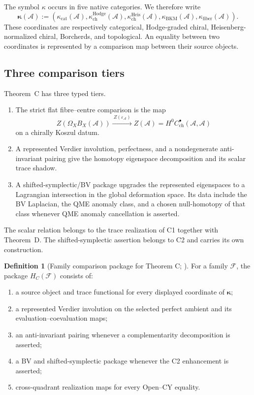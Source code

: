 \documentclass[11pt]{article}
\theoremstyle{plain}
\theoremstyle{definition}
\newtheorem{definition}[theorem]{Definition}
\theoremstyle{remark}
\newcommand{\cA}{\mathcal{A}}
\begin{document}
The symbol \(\kappa\) occurs in five native categories.  We therefore
write
\[
 \boldsymbol\kappa(\cA)
 :=
 \left(
 \kappa_{\mathrm{cat}}(\cA),
 \kappa_{\mathrm{ch}}^{\mathrm{Hodge}}(\cA),
 \kappa_{\mathrm{ch}}^{\mathrm{Heis}}(\cA),
 \kappa_{\mathrm{BKM}}(\cA),
 \kappa_{\mathrm{fiber}}(\cA)
 \right).
\]
These coordinates are respectively categorical, Hodge-graded
chiral, Heisenberg-normalized chiral, Borcherds, and topological.
An equality between two coordinates is represented by a comparison
map between their source objects.

\subsection{Three comparison tiers}

Theorem~C has three typed tiers.

\begin{enumerate}[label=\textsc{C\arabic*.}]
\item The strict flat fibre--centre comparison is the map
\[
 Z\!\left(\Omega_XB_X(\cA)\right)
 \xrightarrow{\ Z(\varepsilon_\cA)\ }
 Z(\cA)=H^0C^\bullet_{\mathrm{ch}}(\cA,\cA)
\]
on a chirally Koszul datum.

\item A represented Verdier involution, perfectness, and a
nondegenerate anti-invariant pairing give the homotopy eigenspace
decomposition and its scalar trace shadow.

\item A shifted-symplectic/BV package upgrades the represented
eigenspaces to a Lagrangian intersection in the global deformation
space.  Its data include the BV Laplacian, the QME anomaly class, and
a chosen null-homotopy of that class whenever QME anomaly cancellation
is asserted.
\end{enumerate}

The scalar relation belongs to the trace realization of \textsc{C1}
together with Theorem~D.  The shifted-symplectic assertion belongs to
\textsc{C2} and carries its own construction.

\begin{definition}[Family comparison package for Theorem C;
\ClaimStatusDefinitional]
\label{def:standalone-theorem-C-package}
For a family \(\mathcal F\), the package \(H_C(\mathcal F)\) consists
of:

\begin{enumerate}[label=\textup{(C\arabic*)}]
\item a source object and trace functional for every displayed
coordinate of \(\boldsymbol\kappa\);
\item a represented Verdier involution on the selected perfect
ambient and its evaluation--coevaluation maps;
\item an anti-invariant pairing whenever a complementarity
decomposition is asserted;
\item a BV and shifted-symplectic package whenever the C2 enhancement
is asserted;
\item cross-quadrant realization maps for every Open--CY equality.
\end{enumerate}
\end{definition}
\end{document}
